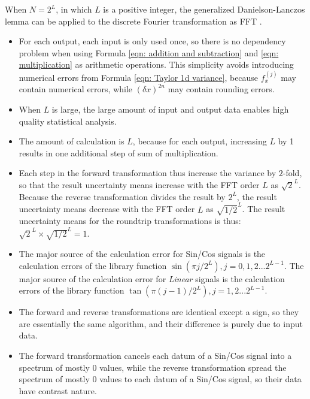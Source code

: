 \documentclass[twoside]{article}
\numberwithin{equation}{section}
\begin{document}
When $N = 2^{L}$, in which $L$ is a positive integer, the generalized Danielson-Lanczos lemma \cite{Numerical_Recipes} can be applied to the discrete Fourier transformation as FFT \cite{Numerical_Recipes}. 
\begin{itemize}

\item For each output, each input is only used once, so there is no dependency problem when using Formula \eqref{eqn: addition and subtraction} and \eqref{eqn: multiplication} as arithmetic operations.
This simplicity avoids introducing numerical errors from Formula \eqref{eqn: Taylor 1d variance}, because $f^{(j)}_x$ may contain numerical errors, while $(\delta x)^{2n}$ may contain rounding errors.

\item When $L$ is large, the large amount of input and output data enables high quality statistical analysis.

\item The amount of calculation is $L$, because for each output, increasing $L$ by 1 results in one additional step of sum of multiplication.

\item Each step in the forward transformation thus increase the variance by $2$-fold, so that the result uncertainty means increase with the FFT order $L$ as $\sqrt{2}^L$.
Because the reverse transformation divides the result by $2^L$, the result uncertainty means decrease with the FFT order $L$ as $\sqrt{1/2}^L$.
The result uncertainty means for the roundtrip transformations is thus: $\sqrt{2}^L \times \sqrt{1/2}^L = 1$.

\item The major source of the calculation error for Sin/Cos signals is the calculation errors of the library function $\sin(\pi j /2^L), j = 0, 1, 2 ... 2^{L-1}$.
The major source of the calculation error for \emph{Linear} signals is the calculation errors of the library function $\tan(\pi (j - 1) /2^L), j = 1, 2 ... 2^{L-1}$.

\item The forward and reverse transformations are identical except a sign, so they are essentially the same algorithm, and their difference is purely due to input data.  

\item The forward transformation cancels each datum of a Sin/Cos signal into a spectrum of mostly $0$ values, while the reverse transformation spread the spectrum of mostly $0$ values to each datum of a Sin/Cos signal, so their data have contrast nature.

\end{itemize}
\end{document}
